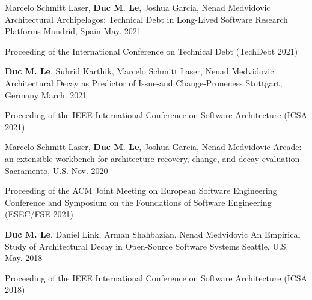 \vspace{-1mm}

\begin{cventries}


\cventry
{Marcelo Schmitt Laser, \textbf{Duc M. Le}, Joshua Garcia, Nenad Medvidovic} %
{Architectural Archipelagos: Technical Debt in Long-Lived Software Research Platforms} %
{Mandrid, Spain} %
{May. 2021} %
{
	\begin{cvitems} %
		\item Proceeding of the International Conference on Technical Debt (TechDebt 2021)
	\end{cvitems}
}

\cventry
{\textbf{Duc M. Le}, Suhrid Karthik, Marcelo Schmitt Laser, Nenad Medvidovic} %
{Architectural Decay as Predictor of Issue-and Change-Proneness} %
{Stuttgart, Germany} %
{March. 2021} %
{
	\begin{cvitems} %
		\item Proceeding of the IEEE International Conference on Software Architecture (ICSA 2021)
	\end{cvitems}
}

\cventry
{Marcelo Schmitt Laser, \textbf{Duc M. Le}, Joshua Garcia, Nenad Medvidovic} %
{Arcade: an extensible workbench for architecture recovery, change, and decay evaluation} %
{Sacramento, U.S.} %
{Nov. 2020} %
{
	\begin{cvitems} %
		\item Proceeding of the ACM Joint Meeting on European Software Engineering Conference and Symposium on the Foundations of Software Engineering (ESEC/FSE 2021)
	\end{cvitems}
}

\cventry
{\textbf{Duc M. Le}, Daniel	Link, Arman	Shahbazian, Nenad Medvidovic} %
{An Empirical Study of Architectural Decay in Open-Source Software Systems} %
{Seattle, U.S.} %
{May. 2018} %
{
	\begin{cvitems} %
		\item Proceeding of the IEEE International Conference on Software Architecture (ICSA 2018)
	\end{cvitems}
}


\end{cventries}
